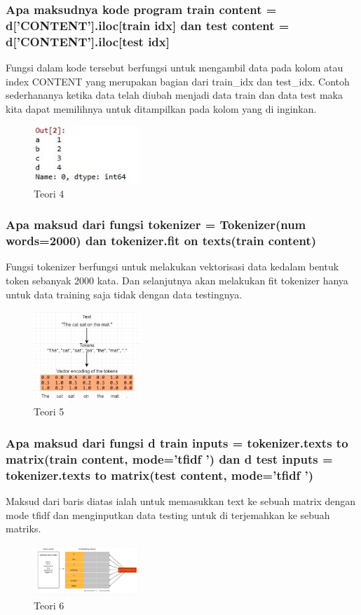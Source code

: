 \subsubsection{Apa maksudnya kode program train content = d[’CONTENT’].iloc[train idx] dan test content = d[’CONTENT’].iloc[test idx]}
\hfill\break
Fungsi dalam kode tersebut berfungsi untuk mengambil data pada kolom atau index CONTENT yang merupakan bagian dari train\_idx dan test\_idx. Contoh sederhananya ketika data telah diubah menjadi data train dan data test maka kita dapat memilihnya untuk ditampilkan pada kolom yang di inginkan. 

\begin{figure}[H]
\centering
	\includegraphics[width=4cm]{figures/1174053/7/4.jpg}
\caption{Teori 4}
\end{figure}

\subsubsection{Apa maksud dari fungsi tokenizer = Tokenizer(num words=2000) dan tokenizer.fit on texts(train content)}
\hfill\break
Fungsi tokenizer berfungsi untuk melakukan vektorisasi data kedalam bentuk token sebanyak 2000 kata. Dan selanjutnya akan melakukan fit tokenizer hanya untuk data training saja tidak dengan data testingnya.
\begin{figure}[H]
\centering
	\includegraphics[width=4cm]{figures/1174053/7/5.jpg}
\caption{Teori 5}
\end{figure}

\subsubsection{Apa maksud dari fungsi d train inputs = tokenizer.texts to matrix(train content, mode=’tfidf ’) dan d test inputs = tokenizer.texts to matrix(test content, mode=’tfidf ’)}
\hfill\break
Maksud dari baris diatas ialah untuk memasukkan text ke sebuah matrix dengan mode tfidf dan menginputkan data testing untuk di terjemahkan ke sebuah matriks.
\begin{figure}[H]
\centering
	\includegraphics[width=4cm]{figures/1174053/7/6.jpg}
\caption{Teori 6}
\end{figure}

